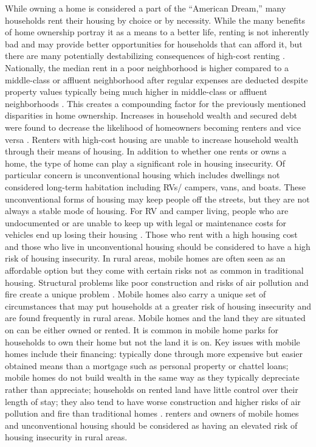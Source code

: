 While owning a home is considered a part of the “American Dream,” many households rent their housing by choice or by necessity. While the many benefits of home ownership portray it as a means to a better life, renting is not inherently bad and may provide better opportunities for households that can afford it, but there are many potentially destabilizing consequences of high-cost renting \citep{drew_believing_2014}. Nationally, the median rent in a poor neighborhood is higher compared to a middle-class or affluent neighborhood after regular expenses are deducted despite property values typically being much higher in middle-class or affluent neighborhoods \citep{desmond_poor_2019}. This creates a compounding factor for the previously mentioned disparities in home ownership. Increases in household wealth and secured debt were found to decrease the likelihood of homeowners becoming renters and vice versa \citep{anderson_effect_2021}. Renters with high-cost housing are unable to increase household wealth through their means of housing.  In addition to whether one rents or owns a home, the type of home can play a significant role in housing insecurity. Of particular concern is unconventional housing which includes dwellings not considered long-term habitation including RVs/ campers, vans, and boats. These unconventional forms of housing may keep people off the streets, but they are not always a stable mode of housing. For RV and camper living, people who are undocumented or are unable to keep up with legal or maintenance costs for vehicles end up losing their housing \citep{wakin_not_2005}. Those who rent with a high housing cost and those who live in unconventional housing should be considered to have a high risk of housing insecurity. In rural areas, mobile homes are often seen as an affordable option but they come with certain risks not as common in traditional housing. Structural problems like poor construction and risks of air pollution and fire create a unique problem \citep{mactavish_policy_2006}. Mobile homes also carry a unique set of circumstances that may put households at a greater risk of housing insecurity and are found frequently in rural areas. Mobile homes and the land they are situated on can be either owned or rented. It is common in mobile home parks for households to own their home but not the land it is on. Key issues with mobile homes include their financing: typically done through more expensive but easier obtained means than a mortgage such as personal property or chattel loans; mobile homes do not build wealth in the same way as they typically depreciate rather than appreciate; households on rented land have little control over their length of stay; they also tend to have worse construction and higher risks of air pollution and fire than traditional homes \citep{mactavish_wrong_2007}.  renters and owners of mobile homes and unconventional housing should be considered as having an elevated risk of housing insecurity in rural areas. 


